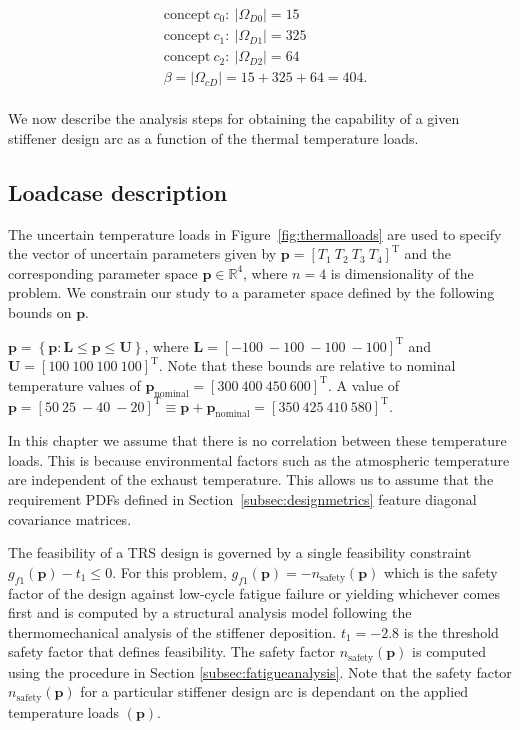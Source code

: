 \begin{equation*}
	\begin{aligned}
		& \mathrm{concept~}c_0:~|\Omega_{D0}| = 15\\
		& \mathrm{concept~}c_1:~|\Omega_{D1}| = 325\\
		& \mathrm{concept~}c_2:~|\Omega_{D2}| = 64\\
		& \beta = |\Omega_{cD}| = 15 + 325 + 64 = 404.\\
	\end{aligned}
\end{equation*}

We now describe the analysis steps for obtaining the capability of a given stiffener design arc as a function of the thermal temperature loads.

\subsection{Loadcase description} \label{subsec:loadcase}

The uncertain temperature loads in Figure~\ref{fig:thermalloads} are used to specify the vector of uncertain parameters given by $\mathbf{p} = \left[T_1 ~ T_2 ~ T_3 ~ T_4\right]^{\mathrm{T}}$ and the corresponding parameter space $\mathbf{p}\in\mathbb{R}^4$, where $n = 4$ is dimensionality of the problem. We constrain our study to a parameter space defined by the following bounds on $\mathbf{p}$.

$\mathbf{p} = \left\{\mathbf{p}: \mathbf{L} \le \mathbf{p} \le \mathbf{U}\right\}$, where $\mathbf{L} = \left[-100 ~ -100 ~ -100 ~ -100\right]^{\mathrm{T}}$ and $\mathbf{U} = \left[100 ~ 100 ~ 100 ~ 100\right]^{\mathrm{T}}$. Note that these bounds are relative to nominal temperature values of $\mathbf{p}_{\textrm{nominal}} = \left[300 ~ 400 ~ 450 ~ 600\right]^{\mathrm{T}}$. A value of $\mathbf{p} = \left[50 ~ 25 ~ -40 ~ -20\right]^{\mathrm{T}} \equiv \mathbf{p} + \mathbf{p}_{\textrm{nominal}} = \left[350 ~ 425 ~ 410 ~ 580\right]^{\mathrm{T}}$.

In this chapter we assume that there is no correlation between these temperature loads. This is because environmental factors such as the atmospheric temperature are independent of the exhaust temperature. This allows us to assume that the requirement \acp{PDF} defined in Section~\ref{subsec:designmetrics} feature diagonal covariance matrices.

The feasibility of a \ac{TRS} design is governed by a single feasibility constraint $g_{f1}(\mathbf{p}) - t_1 \le 0$. For this problem, $g_{f1}(\mathbf{p}) = -n_{\textrm{safety}}(\mathbf{p})$ which is the safety factor of the design against low-cycle fatigue failure or yielding whichever comes first and is computed by a structural analysis model following the thermomechanical analysis of the stiffener deposition. $t_1 = -2.8$ is the threshold safety factor that defines feasibility. The safety factor $n_{\textrm{safety}}(\mathbf{p})$ is computed using the procedure in Section \ref{subsec:fatigueanalysis}. Note that the safety factor $n_{\textrm{safety}}(\mathbf{p})$ for a particular stiffener design arc is dependant on the applied temperature loads $(\mathbf{p})$.

